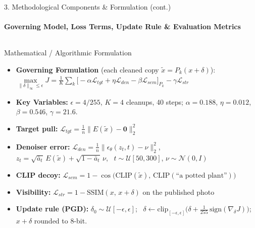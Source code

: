 \documentclass[aspectratio=169, 11pt]{beamer}
\begin{document}
\begin{frame}{3. Methodological Components \& Formulation (cont.)}
    \framesubtitle{Governing Model, Loss Terms, Update Rule \& Evaluation Metrics}
    \begin{columns}[T]
        \begin{block}{Mathematical / Algorithmic Formulation}
            \scriptsize
            \begin{itemize}
                \item \textbf{Governing Formulation} (each cleaned copy $\tilde{x}=P_k(x+\delta)$):\\[1pt]
                \mbox{$\max\limits_{\|\delta\|_\infty\le\epsilon} J=\tfrac{1}{K}\sum_{k}\big[-\alpha\mathcal{L}_{tgt}+\eta\mathcal{L}_{den}-\beta\mathcal{L}_{sem}\big]_{P_k}-\gamma\mathcal{L}_{str}$}
                \item \textbf{Key Variables:} $\epsilon=4/255$, $K=4$ cleanups, 40 steps; $\alpha=0.188$, $\eta=0.012$, $\beta=0.546$, $\gamma=21.6$.
                \item \textbf{Target pull:} $\mathcal{L}_{tgt}=\frac{1}{n}\big\|E(\tilde{x})-\mathbf{0}\big\|_2^2$
                \item \textbf{Denoiser error:} $\mathcal{L}_{den}=\frac{1}{n}\big\|\epsilon_\theta(z_t,t)-\nu\big\|_2^2$, \\
                      $z_t=\sqrt{\bar{a}_t}\,E(\tilde{x})+\sqrt{1-\bar{a}_t}\,\nu$, \ $t\sim\mathcal{U}[50,300]$, $\nu\sim\mathcal{N}(0,I)$
                \item \textbf{CLIP decoy:} $\mathcal{L}_{sem}=1-\cos\big(\mathrm{CLIP}(\tilde{x}),\,\mathrm{CLIP}(\text{``a potted plant''})\big)$
                \item \textbf{Visibility:} $\mathcal{L}_{str}=1-\mathrm{SSIM}(x,\,x+\delta)$ on the published photo
                \item \textbf{Update rule (PGD):} $\delta_0\sim\mathcal{U}[-\epsilon,\epsilon]$; \
                      $\delta\leftarrow\mathrm{clip}_{[-\epsilon,\epsilon]}\big(\delta+\tfrac{1}{255}\,\mathrm{sign}(\nabla_\delta J)\big)$; $x+\delta$ rounded to 8-bit.
            \end{itemize}
        \end{block}


\end{columns}
\end{frame}
\end{document}
